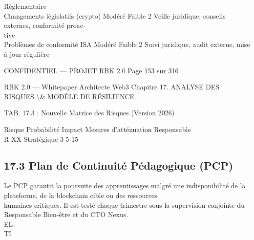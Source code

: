 Réglementaire\\
Changements législatifs (crypto)                     Modéré     Faible        2    Veille juridique, conseils externes, conformité proac-\\
tive\\
Problèmes de conformité ISA                          Modéré     Faible        2    Suivi juridique, audit externe, mise à jour régulière\\
\vspace{0.5em}
\vspace{0.5em}
\vspace{0.5em}
\begin{confidential}CONFIDENTIEL — PROJET RBK 2.0                              Page 153 sur 316\end{confidential}
RBK 2.0 — Whitepaper Architecte Web3                                        Chapitre 17. ANALYSE DES RISQUES \textbackslash{}& MODÈLE DE RÉSILIENCE\\
\vspace{0.5em}
\vspace{0.5em}
\begin{center}\begin{tabular}TAB. 17.3 : Nouvelle Matrice des Risques (Version 2026)\end{tabular}\end{center}
\vspace{0.5em}
\vspace{0.5em}
Risque Probabilité Impact Mesures d’atténuation Responsable\\
R-XX   Stratégique 3      5                     15\\
\vspace{0.5em}
\vspace{0.5em}
\vspace{0.5em}
\vspace{0.5em}
\subsection{17.3 Plan de Continuité Pédagogique (PCP)}
Le PCP garantit la poursuite des apprentissages malgré une indisponibilité de la plateforme, de la blockchain cible ou des ressources\\
humaines critiques. Il est testé chaque trimestre sous la supervision conjointe du Responsable Bien-être et du CTO Nexus.\\
\vspace{0.5em}
\vspace{0.5em}
\vspace{0.5em}
\vspace{0.5em}
EL\\
TI\\
